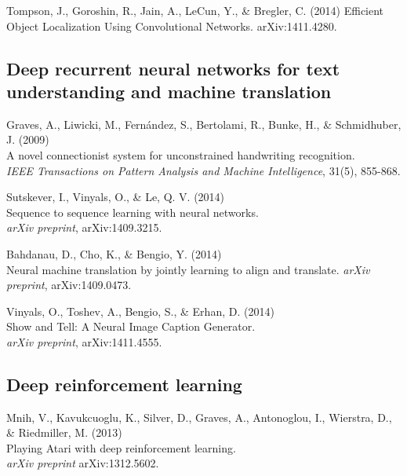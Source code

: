 \documentclass[]{article}
\begin{document}

Tompson, J., Goroshin, R., Jain, A., LeCun, Y., \& Bregler, C. (2014)
Efficient Object Localization Using Convolutional
Networks. arXiv:1411.4280.


\subsection{Deep recurrent neural networks for text understanding and machine translation}

Graves, A., Liwicki, M., Fernández, S., Bertolami, R., Bunke, H., \&
Schmidhuber, J. (2009)\\ A novel connectionist system for unconstrained
handwriting recognition.\\ {\it IEEE Transactions on Pattern Analysis and
  Machine Intelligence}, 31(5), 855-868.


Sutskever, I., Vinyals, O., \& Le, Q. V. (2014)\\ Sequence to sequence
learning with neural networks.\\ {\it arXiv preprint}, arXiv:1409.3215.

Bahdanau, D., Cho, K., \& Bengio, Y. (2014)\\ Neural machine translation by
jointly learning to align and translate.  {\it arXiv preprint},
arXiv:1409.0473.

Vinyals, O., Toshev, A., Bengio, S., \& Erhan, D. (2014)\\ Show and Tell: A
Neural Image Caption Generator.\\ {\it arXiv preprint}, arXiv:1411.4555.




\subsection{Deep reinforcement learning}
Mnih, V., Kavukcuoglu, K., Silver, D., Graves, A., Antonoglou, I.,
Wierstra, D., \& Riedmiller, M. (2013)\\ Playing Atari with deep
reinforcement learning.\\ {\it arXiv preprint} arXiv:1312.5602.
\end{document}
